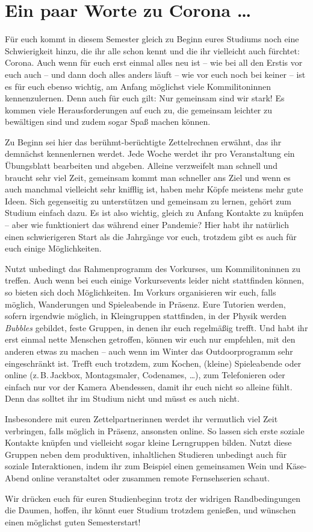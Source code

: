 \section{Ein paar Worte zu Corona \ldots}

Für euch kommt in diesem Semester gleich zu Beginn eures Studiums noch eine Schwierigkeit hinzu, die ihr alle schon kennt und die ihr vielleicht auch fürchtet: Corona.
Auch wenn für euch erst einmal alles neu ist -- wie bei all den Erstis vor euch auch -- und dann doch alles anders läuft -- wie vor euch noch bei keiner -- ist es für euch ebenso wichtig, am Anfang möglichst viele Kommilitoninnen kennenzulernen. Denn auch für euch gilt: Nur gemeinsam sind wir stark! Es kommen viele Herausforderungen auf euch zu, die gemeinsam leichter zu bewältigen sind und zudem sogar Spaß machen können.

Zu Beginn sei hier das berühmt-berüchtigte Zettelrechnen erwähnt, das ihr demnächst kennenlernen werdet. Jede Woche werdet ihr pro Veranstaltung ein Übungsblatt bearbeiten und abgeben. Alleine verzweifelt man schnell und braucht sehr viel Zeit, gemeinsam kommt man schneller ans Ziel und wenn es auch manchmal vielleicht sehr knifflig ist, haben mehr Köpfe meistens mehr gute Ideen. Sich gegenseitig zu unterstützen und gemeinsam zu lernen, gehört zum Studium einfach dazu. Es ist also wichtig, gleich zu Anfang Kontakte zu knüpfen -- aber wie funktioniert das während einer Pandemie? Hier habt ihr natürlich einen schwierigeren Start als die Jahrgänge vor euch, trotzdem gibt es auch für euch einige Möglichkeiten.

Nutzt unbedingt das Rahmenprogramm des Vorkurses, um Kommilitoninnen zu treffen. Auch wenn bei euch einige Vorkursevents leider nicht stattfinden können, so bieten sich doch Möglichkeiten. Im Vorkurs organisieren wir euch, falls möglich, Wanderungen und Spieleabende in Präsenz.
Eure Tutorien werden, sofern irgendwie möglich, in Kleingruppen stattfinden, in der Physik werden \emph{Bubbles} gebildet, feste Gruppen, in denen ihr euch regelmäßig trefft.
Und habt ihr erst einmal nette Menschen getroffen, können wir euch nur empfehlen, mit den anderen etwas zu machen -- auch wenn im Winter das Outdoorprogramm sehr eingeschränkt ist. Trefft euch trotzdem, zum Kochen, (kleine) Spieleabende oder online (z.\,B.\,Jackbox, Montagsmaler, Codenames, \ldots), zum Telefonieren oder einfach nur vor der Kamera Abendessen, damit ihr euch nicht so alleine fühlt. Denn das solltet ihr im Studium nicht und müsst es auch nicht.

Insbesondere mit euren Zettelpartnerinnen werdet ihr vermutlich viel Zeit verbringen, falls möglich in Präsenz, ansonsten online. So lassen sich erste soziale Kontakte knüpfen und vielleicht sogar kleine Lerngruppen bilden. Nutzt diese Gruppen neben dem produktiven, inhaltlichen Studieren unbedingt auch für soziale Interaktionen, indem ihr zum Beispiel einen gemeinsamen Wein und Käse-Abend online veranstaltet oder zusammen remote Fernsehserien schaut.

Wir drücken euch für euren Studienbeginn trotz der widrigen Randbedingungen die Daumen, hoffen, ihr könnt euer Studium trotzdem genießen, und wünschen einen möglichst guten Semesterstart!
